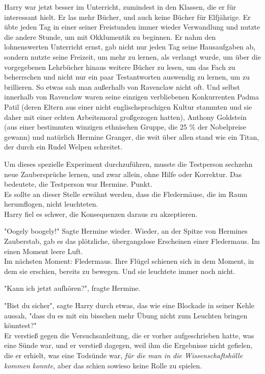 {Harry war jetzt besser im Unterricht, zumindest in den Klassen, die er für interessant hielt. Er las mehr Bücher, und auch keine Bücher für Elfjährige. Er übte jeden Tag in einer seiner Freistunden immer wieder Verwandlung und nutzte die andere Stunde, um mit Okklumentik zu beginnen. Er nahm den lohnenswerten Unterricht ernst, gab nicht nur jeden Tag seine Hausaufgaben ab, sondern nutzte seine Freizeit, um mehr zu lernen, als verlangt wurde, um über die vorgegebenen Lehrbücher hinaus weitere Bücher zu lesen, um das Fach zu beherrschen und nicht nur ein paar Testantworten auswendig zu lernen, um zu brillieren. So etwas sah man außerhalb von Ravenclaw nicht oft. Und selbst innerhalb von Ravenclaw waren seine einzigen verbliebenen Konkurrenten Padma Patil (deren Eltern aus einer nicht englischsprachigen Kultur stammten und sie daher mit einer echten Arbeitsmoral großgezogen hatten), Anthony Goldstein (aus einer bestimmten winzigen ethnischen Gruppe, die 25 \% der Nobelpreise gewann) und natürlich Hermine Granger, die weit über allen stand wie ein Titan, der durch ein Rudel Welpen schreitet.

Um dieses spezielle Experiment durchzuführen, musste die Testperson sechzehn neue Zaubersprüche lernen, und zwar allein, ohne Hilfe oder Korrektur. Das bedeutete, die Testperson war Hermine. Punkt.\\ Es sollte an dieser Stelle erwähnt werden, dass die Fledermäuse, die im Raum herumflogen, nicht leuchteten.\\ Harry fiel es schwer, die Konsequenzen daraus zu akzeptieren.

"Oogely boogely!" Sagte Hermine wieder. Wieder, an der Spitze von Hermines Zauberstab, gab es das plötzliche, übergangslose Erscheinen einer Fledermaus. Im einen Moment leere Luft.\\ Im nächsten Moment: Fledermaus. Ihre Flügel schienen sich in dem Moment, in dem sie erschien, bereits zu bewegen. Und sie leuchtete immer noch nicht.

"Kann ich jetzt aufhören?", fragte Hermine.

"Bist du sicher", sagte Harry durch etwas, das wie eine Blockade in seiner Kehle aussah, "dass du es mit ein bisschen mehr Übung nicht zum Leuchten bringen könntest?"\\ Er verstieß gegen die Versuchsanleitung, die er vorher aufgeschrieben hatte, was eine Sünde war, und er verstieß dagegen, weil ihm die Ergebnisse nicht gefielen, die er erhielt, was eine Todsünde war, \emph{für die man in die Wissenschaftshölle kommen konnte}, aber das schien sowieso keine Rolle zu spielen.

}
